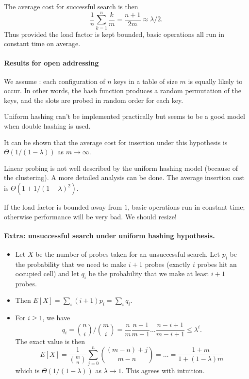 The average cost for successful search is then 
$$
\frac{1}{n} \sum_{k=1}^n \frac{k}{m} = \frac{n+1}{2m} \approx \lambda/2.
$$
Thus provided the load factor is kept bounded, basic operations all run in 
constant time on average. 


\paragraph{Results for open addressing}

We assume : each configuration of 
$n$ keys in a table of size $m$ is equally likely to occur. In other words, the 
hash function produces a random permutation of the keys, and the slots are 
probed in random order for each key.

Uniform hashing can't be implemented practically but seems to be a good 
model when double hashing is used.

It can be shown that the average cost for insertion under this 
hypothesis is $\Theta(1/(1-\lambda))$ as $m \to \infty$. 

Linear probing is not well described by the uniform hashing model 
(because of the clustering). A more detailed analysis can be done. 
The average insertion cost is $\Theta(1 + 1/(1 - \lambda)^2)$.

If the load factor is bounded away from $1$, basic operations 
run in constant time; otherwise performance will be very bad. We should resize!


\paragraph{Extra: unsuccessful search under uniform hashing hypothesis.}
\begin{itemize}
\item Let $X$ be the number of probes taken for an unsuccessful search. 
Let $p_i$ be the probability that we need to make $i+1$ probes 
(exactly $i$ probes hit an occupied cell) and let $q_i$ be the probability 
that we make at least $i+1$ probes. 
\item Then 
$E[X] = \sum_i (i+1) p_i = \sum_i q_i$.
\item For $i \geq 1$, we have
$$ q_i = \binom{n}{i}/\binom{m}{i} = \frac{n}{m} \frac{n-1}{m-1} 
\dots \frac{n - i + 1}{m - i + 1}  \leq \lambda^i.
$$
The exact value is then
$$
E[X] = \frac{1}{\binom{m}{n}} \sum_{j=0}^n \binom{(m-n)+j}{m-n} = 
\dots = \frac{1+m}{1+(1-\lambda)m}
$$
which is $\Theta(1/(1 - \lambda))$ as $\lambda \to 1$. This agrees with 
intuition.
\end{itemize}

